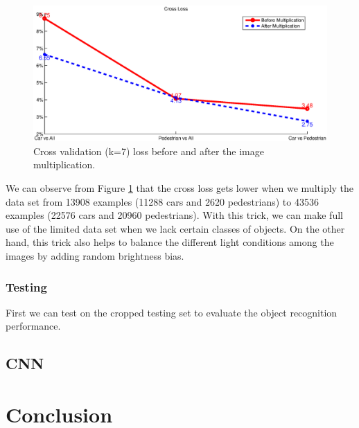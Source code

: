 \documentclass{article} %
\begin{document}
\begin{figure}[htb]
\begin{center}
\includegraphics[width=\textwidth]{crossloss.eps}
\end{center}
\caption{Cross validation (k=7) loss before and after the image multiplication.
\label{fig:crossloss}}
\end{figure}

We can observe from Figure \ref{fig:crossloss} that the cross loss gets lower when we multiply the data set from 13908 examples (11288 cars and 2620 pedestrians) to 43536 examples (22576 cars and 20960 pedestrians). With this trick, we can make full use of the limited data set when we lack certain classes of objects. On the other hand, this trick also helps to balance the different light conditions among the images by adding random brightness bias. 

\subsubsection{Testing}

First we can test on the cropped testing set to evaluate the object recognition performance. 

\subsection{CNN}

\section{Conclusion}

\end{document}
